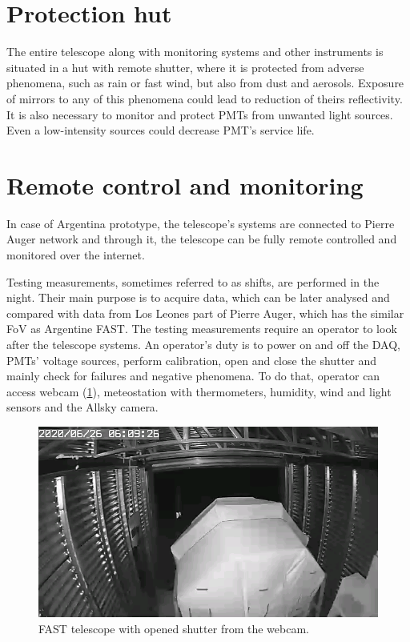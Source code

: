 \section{Protection hut}
The entire telescope along with monitoring systems and other instruments is situated in a hut with remote shutter, where it is protected from adverse phenomena, such as rain or fast wind, but also from dust and aerosols. Exposure of mirrors to any of this phenomena could lead to reduction of theirs reflectivity. It is also necessary to monitor and protect PMTs from unwanted light sources. Even a low-intensity sources could decrease PMT's service life.

\section{Remote control and monitoring}
In case of Argentina prototype, the telescope's systems are connected to Pierre Auger network and through it, the telescope can be fully remote controlled and monitored over the internet. 

\par
Testing measurements, sometimes referred to as shifts, are performed in the night. Their main purpose is to acquire data, which can be later analysed and compared with data from Los Leones part of Pierre Auger, which has the similar FoV as Argentine FAST. 
The testing measurements require an operator to look after the telescope systems. An operator's duty is to power on and off the DAQ, PMTs' voltage sources, perform calibration, open and close the shutter and mainly check for failures and negative phenomena. To do that, operator can access webcam (\ref{FASTCam}), meteostation with thermometers, humidity, wind and light sensors and the Allsky camera.

\begin{figure}[H]
 \centering
 \includegraphics[scale = 0.5]{./pictures/operatinFast}
 \caption{FAST telescope with opened shutter from the webcam.}
 \label{FASTCam}
 
\end{figure}

